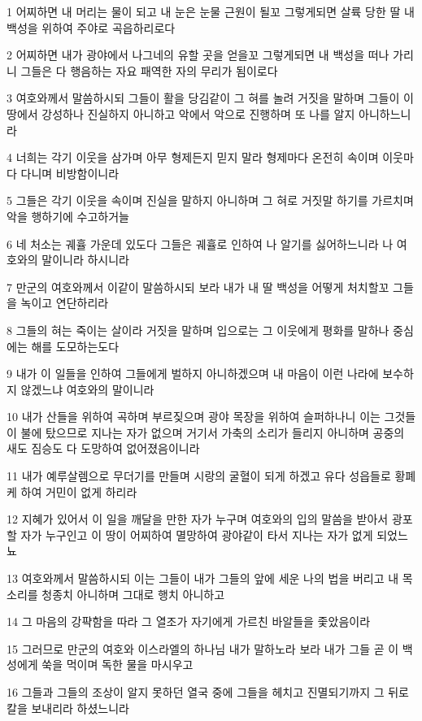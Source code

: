 \par 1 어찌하면 내 머리는 물이 되고 내 눈은 눈물 근원이 될꼬 그렇게되면 살륙 당한 딸 내 백성을 위하여 주야로 곡읍하리로다
\par 2 어찌하면 내가 광야에서 나그네의 유할 곳을 얻을꼬 그렇게되면 내 백성을 떠나 가리니 그들은 다 행음하는 자요 패역한 자의 무리가 됨이로다
\par 3 여호와께서 말씀하시되 그들이 활을 당김같이 그 혀를 놀려 거짓을 말하며 그들이 이 땅에서 강성하나 진실하지 아니하고 악에서 악으로 진행하며 또 나를 알지 아니하느니라
\par 4 너희는 각기 이웃을 삼가며 아무 형제든지 믿지 말라 형제마다 온전히 속이며 이웃마다 다니며 비방함이니라
\par 5 그들은 각기 이웃을 속이며 진실을 말하지 아니하며 그 혀로 거짓말 하기를 가르치며 악을 행하기에 수고하거늘
\par 6 네 처소는 궤휼 가운데 있도다 그들은 궤휼로 인하여 나 알기를 싫어하느니라 나 여호와의 말이니라 하시니라
\par 7 만군의 여호와께서 이같이 말씀하시되 보라 내가 내 딸 백성을 어떻게 처치할꼬 그들을 녹이고 연단하리라
\par 8 그들의 혀는 죽이는 살이라 거짓을 말하며 입으로는 그 이웃에게 평화를 말하나 중심에는 해를 도모하는도다
\par 9 내가 이 일들을 인하여 그들에게 벌하지 아니하겠으며 내 마음이 이런 나라에 보수하지 않겠느냐 여호와의 말이니라
\par 10 내가 산들을 위하여 곡하며 부르짖으며 광야 목장을 위하여 슬퍼하나니 이는 그것들이 불에 탔으므로 지나는 자가 없으며 거기서 가축의 소리가 들리지 아니하며 공중의 새도 짐승도 다 도망하여 없어졌음이니라
\par 11 내가 예루살렘으로 무더기를 만들며 시랑의 굴혈이 되게 하겠고 유다 성읍들로 황폐케 하여 거민이 없게 하리라
\par 12 지혜가 있어서 이 일을 깨달을 만한 자가 누구며 여호와의 입의 말씀을 받아서 광포할 자가 누구인고 이 땅이 어찌하여 멸망하여 광야같이 타서 지나는 자가 없게 되었느뇨
\par 13 여호와께서 말씀하시되 이는 그들이 내가 그들의 앞에 세운 나의 법을 버리고 내 목소리를 청종치 아니하며 그대로 행치 아니하고
\par 14 그 마음의 강퍅함을 따라 그 열조가 자기에게 가르친 바알들을 좇았음이라
\par 15 그러므로 만군의 여호와 이스라엘의 하나님 내가 말하노라 보라 내가 그들 곧 이 백성에게 쑥을 먹이며 독한 물을 마시우고
\par 16 그들과 그들의 조상이 알지 못하던 열국 중에 그들을 헤치고 진멸되기까지 그 뒤로 칼을 보내리라 하셨느니라

